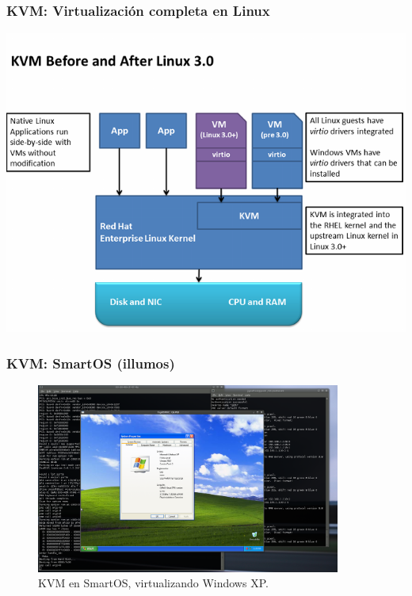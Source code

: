 \documentclass{beamer}
\begin{document}

\begin{frame}
\frametitle{KVM: Virtualización completa en Linux}
\begin{center}
\includegraphics[scale=0.2,clip=false]{figs/kvm.png}
\end{center}

\end{frame}


\begin{frame}
\frametitle{KVM: SmartOS (illumos)}
\vspace{-0.25cm}
\begin{figure}
\includegraphics[width=10cm]{figs/KVM-xp-booted.png}
\caption{KVM en SmartOS, virtualizando Windows XP.}
\end{figure}

\end{frame}
\end{document}
